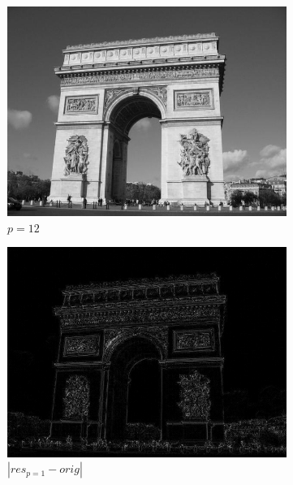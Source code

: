\documentclass[a4paper,10pt]{report}
\begin{document}
\begin{figure}[h]
\begin{subfigure}{0.32\textwidth}
    \includegraphics[width=0.99\linewidth]{ressource/flouresultat_p12.png} 
    \caption{\(p=12\)}
    \label{fig:p12}
  \end{subfigure}
  \begin{subfigure}{0.32\textwidth}
    \includegraphics[width=0.99\linewidth]{ressource/diffp1stretch.png} 
    \caption{\(|res_{p=1} - orig|\)}
    \label{fig:diffp1}
  \end{subfigure}
  \begin{subfigure}{0.32\textwidth}

\end{subfigure}
\end{figure}
\end{document}
